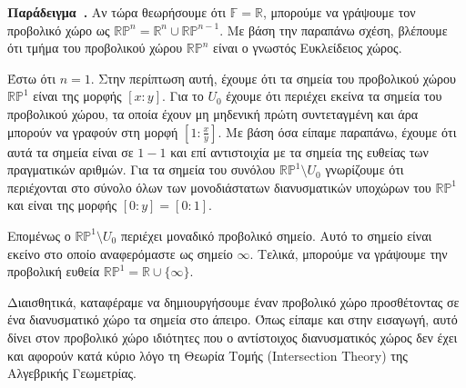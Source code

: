 \documentclass[12pt, a4paper]{book}
\newcounter{example}[section]
\newenvironment{example}[1][]{\refstepcounter{example}\par\medskip
   \textbf{Παράδειγμα~\theexample. #1} \rmfamily}{\medskip}
\begin{document}
\begin{example}
Αν τώρα θεωρήσουμε ότι $\mathbb{F} = \mathbb{R}$, μπορούμε να γράψουμε τον προβολικό χώρο ως $\mathbb{R}\mathbb{P}^n = \mathbb{R}^n \cup \mathbb{R}\mathbb{P}^{n-1}$. Με βάση την παραπάνω σχέση, βλέπουμε ότι τμήμα του προβολικού χώρου $\mathbb{R}\mathbb{P}^n$ είναι ο γνωστός Ευκλείδειος χώρος.
 
Έστω ότι $n=1$. Στην περίπτωση αυτή, έχουμε ότι τα σημεία του προβολικού χώρου $\mathbb{R}\mathbb{P}^1$ είναι της μορφής $[x:y]$. Για το $U_0$ έχουμε ότι περιέχει εκείνα τα σημεία του προβολικού χώρου, τα οποία έχουν μη μηδενική πρώτη συντεταγμένη και άρα μπορούν να γραφούν στη μορφή $[1:\frac{x}{y}]$. Με βάση όσα είπαμε παραπάνω, έχουμε ότι αυτά τα σημεία είναι σε $1-1$ και επί αντιστοιχία με τα σημεία της ευθείας των πραγματικών αριθμών. Για τα σημεία του συνόλου $\mathbb{R}\mathbb{P}^1 \setminus U_0$ γνωρίζουμε ότι περιέχονται στο σύνολο όλων των μονοδιάστατων διανυσματικών υποχώρων του $\mathbb{R}\mathbb{P}^1$  και είναι της μορφής $[0:y] = [0:1]$.

Επομένως ο $\mathbb{R}\mathbb{P}^1 \setminus U_0$ περιέχει μοναδικό προβολικό σημείο. Αυτό το σημείο είναι εκείνο στο οποίο αναφερόμαστε ως σημείο $\infty$. Τελικά, μπορούμε να γράψουμε την προβολική ευθεία $\mathbb{R}\mathbb{P}^1 = \mathbb{R} \cup \{\infty\}$.
\end{example}

Διαισθητικά, καταφέραμε να δημιουργήσουμε έναν προβολικό χώρο προσθέτοντας σε ένα διανυσματικό χώρο τα σημεία στο άπειρο. Όπως είπαμε και στην εισαγωγή, αυτό δίνει στον προβολικό χώρο ιδιότητες που ο αντίστοιχος διανυσματικός χώρος δεν έχει και αφορούν κατά κύριο λόγο τη Θεωρία Τομής (\textlatin{Intersection Theory}) της Αλγεβρικής Γεωμετρίας.
\end{document}
